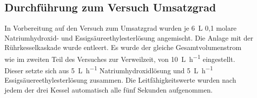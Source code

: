 \subsection{Durchführung zum Versuch Umsatzgrad}

In Vorbereitung auf den Versuch zum Umsatzgrad wurden je \SI{6}{\liter} 0,1 molare Natriumhydroxid- und Essigsäureethylesterlösung angemischt. Die Anlage mit der Rührkesselkaskade wurde entleert. Es wurde der gleiche Gesamtvolumenstrom wie im zweiten Teil des Versuches zur Verweilzeit, von \SI{10}{\liter\per\hour} eingestellt. Dieser setzte sich aus \SI{5}{\liter\per\hour} Natriumhydroxidlösung und \SI{5}{\liter\per\hour} Essigsäuereethylesterlösung zusammen. Die Leitfähigkeitswerte wurden nach jedem der drei Kessel automatisch alle fünf Sekunden aufgenommen.





